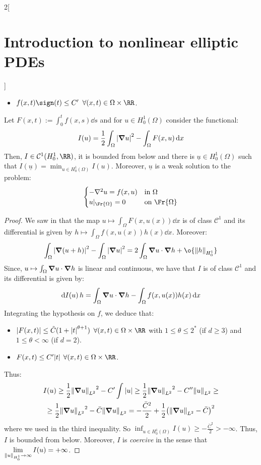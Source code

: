 \documentclass[../../../main_math.tex]{subfiles}
\begin{document}
\begin{multicols}{2}[\section{Introduction to nonlinear elliptic PDEs}]
\begin{theorem}
\begin{itemize}
      \item $f(x,t)\sign(t)\leq C'$ $\forall (x,t)\in \Omega\times \RR$.
    \end{itemize}
    Let $F(x,t):=\int_0^tf(x,s)\dd{s}$ and for $u\in H_0^1(\Omega)$ consider the functional:
    $$
      I(u)=\frac{1}{2}\int_\Omega \abs{\grad u}^2-\int_\Omega F(x,u)\dd{x}
    $$
    Then, $I\in\mathcal{C}^1(H_0^1,\RR)$, it is bounded from below and there is $\underline{u}\in H_0^1(\Omega)$ such that $\displaystyle I(\underline{u})=\min_{u\in H_0^1(\Omega)}I(u)$. Moreover, $\underline{u}$ is a weak solution to the problem:
    \begin{equation}
      \label{INEPDE:eq_problem_min}
      \begin{cases}
        -\laplacian u=f(x,u) & \text{in }\Omega      \\
        u|_{\Fr{\Omega}}=0   & \text{on }\Fr{\Omega}
      \end{cases}
    \end{equation}
  \end{theorem}
  \begin{proof}
    We saw in  that the map $u\mapsto \int_\Omega F(x,u(x))\dd{x}$ is of class $\mathcal{C}^1$ and its differential is given by $h\mapsto \int_\Omega f(x,u(x))h(x)\dd{x}$. Moreover:
    $$
      \int_\Omega\abs{\grad(u+h)}^2-\int_\Omega\abs{\grad u}^2=2\int_\Omega \grad u\cdot \grad h+\o{\norm{h}_{H_0^1}}
    $$
    Since, $u\mapsto \int_\Omega \grad u\cdot \grad h$ is linear and continuous, we have that $I$ is of class $\mathcal{C}^1$ and its differential is given by:
    $$
      \dd{I(u)}h=\int_\Omega \grad u\cdot \grad h-\int_\Omega f(x,u(x))h(x)\dd{x}
    $$
    Integrating the hypothesis on $f$, we deduce that:
    \begin{itemize}
      \item $\abs{F(x,t)}\leq \tilde{C} (1+\abs{t}^{\theta+1})$ $\forall (x,t)\in \Omega\times \RR$ with $1\leq \theta\leq 2^*$ (if $d\geq 3$) and $1\leq \theta<\infty$ (if $d=2$).
      \item $F(x,t)\leq C'\abs{t}$ $\forall (x,t)\in \Omega\times \RR$.
    \end{itemize}
    Thus:
    \begin{multline*}
      I(u)\geq \frac{1}{2}{\norm{\grad u}_{L^2}}^2-C'\int \abs{u}\geq \frac{1}{2}{\norm{\grad u}_{L^2}}^2-C''{\norm{u}_{L^2}}\geq \\\geq \frac{1}{2} {\norm{\grad u}_{L^2}}^2-\bar{C}{\norm{\grad u}_{L^2}}
      =-\frac{\bar{C}^2}{2}+\frac{1}{2}{\left(\norm{\grad u}_{L^2}-\bar{C}\right)}^2
    \end{multline*}
    where we used  in the third inequality. So $\displaystyle \inf_{u\in H_0^1(\Omega)}I(u)\geq -\frac{\bar{C}^2}{2}>-\infty$. Thus, $I$ is bounded from below. Moreover, $I$ is \emph{coercive} in the sense that $\displaystyle \lim_{\norm{u}_{H_0^1}\to\infty}I(u)=+\infty$.


\end{proof}
\end{multicols}
\end{document}
